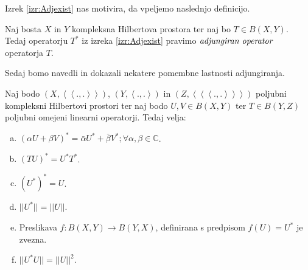 \documentclass[mat2]{matdelo}
\newcommand{\C}{\mathbb{C}}
\newcommand{\abs}[1]{\ensuremath{\lvert #1 \rvert}}
\newcommand{\norm}[1]{\abs{\abs{#1}}}
\newcommand{\pojem}[1]{\ensuremath{\emph{#1}}}
\newcommand{\Sp}[2]{\ensuremath{\left<#1, #2\right>}}
\newcommand{\Spp}[2]{\ensuremath{\left<\left<#1, #2\right>\right>}}
\newcommand{\Sppp}[2]{\ensuremath{\left<\left<\left<#1, #2\right>\right>\right>}}
\newcommand{\map}[3]{\ensuremath{{#1}:{#2}\rightarrow{#3}}}
\begin{document}
			Izrek \ref{izr:Adjexist} nas motivira, da vpeljemo naslednjo definicijo.
			\begin{definicija}
				\label{def:adjop}
				Naj bosta $X$ in $Y$ kompleksna Hilbertova prostora ter naj bo $T\in B(X, Y)$. Tedaj operatorju $T^*$ iz izreka \ref{izr:Adjexist} pravimo \pojem{adjungiran operator} operatorja $T$.
			\end{definicija}
			Sedaj bomo navedli in dokazali nekatere pomembne lastnosti adjungiranja.
			
			\begin{izrek}
				\label{izr:adjlast}
				Naj bodo $(X, \Spp{.}{.})$, $(Y, \Sp{.}{.})$ in $(Z, \Sppp{.}{.})$ poljubni kompleksni Hilbertovi prostori ter naj bodo $U, V \in B(X, Y)$ ter $T \in B(Y, Z)$ poljubni omejeni linearni operatorji. Tedaj velja: \begin{enumerate}[a)]
					\item $(\alpha U + \beta V)^* = \bar{\alpha}U^* + \bar{\beta}V^*; \forall \alpha, \beta \in \C$.
					\item $(TU)^* = U^*T^*$.
					\item $(U^*)^* = U$.
					\item $\norm{U^*} = \norm{U}$.
					\item Preslikava $\map{f}{B(X, Y)}{B(Y, X)}$, definirana s predpisom $f(U) = U^*$ je zvezna.
					\item $\norm{U^*U} = \norm{U}^2$.
				\end{enumerate}
			\end{izrek}
			
\end{document}
